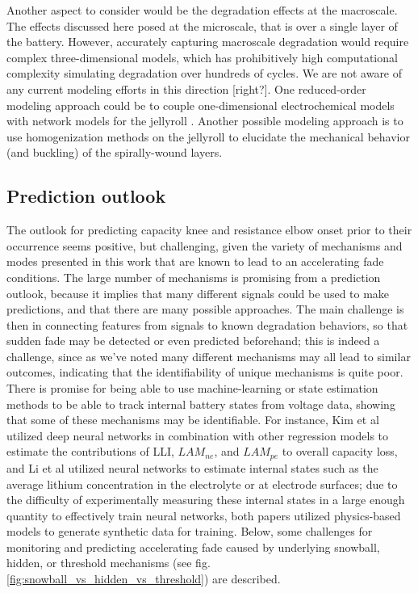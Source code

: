 \documentclass[journal=jpclcd,manuscript=article]{achemso}
\begin{document}
Another aspect to consider would be the degradation effects at the macroscale. The effects discussed here posed at the microscale, that is over a single layer of the battery. However, accurately capturing macroscale degradation would require complex three-dimensional models, which has prohibitively high computational complexity simulating degradation over hundreds of cycles. We are not aware of any current modeling efforts in this direction [right?]. One reduced-order modeling approach could be to couple one-dimensional electrochemical models with network models for the jellyroll \cite{tranter_probing_2020}. Another possible modeling approach is to use homogenization methods on the jellyroll \cite{psaltis_homogenisation_2020} to elucidate the mechanical behavior (and buckling) of the spirally-wound layers.

\subsection{Prediction outlook}
The outlook for predicting capacity knee and resistance elbow onset prior to their occurrence seems positive, but challenging, given the variety of mechanisms and modes presented in this work that are known to lead to an accelerating fade conditions. The large number of mechanisms is promising from a prediction outlook, because it implies that many different signals could be used to make predictions, and that there are many possible approaches. The main challenge is then in connecting features from signals to known degradation behaviors, so that sudden fade may be detected or even predicted beforehand; this is indeed a challenge, since as we've noted many different mechanisms may all lead to similar outcomes, indicating that the identifiability of unique mechanisms is quite poor. There is promise for being able to use machine-learning or state estimation methods to be able to track internal battery states from voltage data, showing that some of these mechanisms may be identifiable. For instance, Kim et al \cite{kim_2021} utilized deep neural networks in combination with other regression models to estimate the contributions of LLI, $LAM_{ne}$, and $LAM_{pe}$ to overall capacity loss, and Li et al \cite{li_2021} utilized neural networks to estimate internal states such as the average lithium concentration in the electrolyte or at electrode surfaces; due to the difficulty of experimentally measuring these internal states in a large enough quantity to effectively train neural networks, both papers utilized physics-based models to generate synthetic data for training. Below, some challenges for monitoring and predicting accelerating fade caused by underlying snowball, hidden, or threshold mechanisms (see fig.  \ref{fig:snowball_vs_hidden_vs_threshold}) are described.
\end{document}
